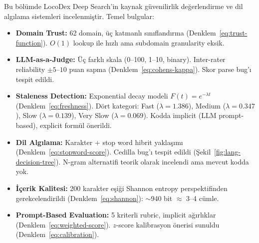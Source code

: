 \begin{ozet}
Bu b\"{o}l\"{u}mde LocoDex Deep Search'in kaynak g\"{u}venilirlik de\u{g}erlendirme ve dil alg{\i}lama sistemleri incelenmi\c{s}tir. Temel bulgular:

\begin{itemize}[leftmargin=1.5em]
  \item \textbf{Domain Trust:} 62 domain, \"{u}\c{c} katmanl{\i} s{\i}n{\i}fland{\i}rma (Denklem~\ref{eq:trust-function}). $O(1)$ lookup ile h{\i}zl{\i} ama subdomain granularity eksik.

  \item \textbf{LLM-as-a-Judge:} \"{U}\c{c} farkl{\i} skala (0--100, 1--10, binary). Inter-rater reliability $\pm 5$--$10$ puan sapma (Denklem~\ref{eq:cohens-kappa}). Skor parse bug'{\i} tespit edildi.

  \item \textbf{Staleness Detection:} Exponential decay modeli $F(t) = e^{-\lambda t}$ (Denklem~\ref{eq:freshness}). D\"{o}rt kategori: Fast ($\lambda=1.386$), Medium ($\lambda=0.347$), Slow ($\lambda=0.139$), Very Slow ($\lambda=0.069$). Kodda implicit (LLM prompt-based), explicit form\"{u}l \"{o}nerildi.

  \item \textbf{Dil Alg{\i}lama:} Karakter $+$ stop word hibrit yakla\c{s}{\i}m{\i} (Denklem~\ref{eq:stopword-score}). Cedilla bug'{\i} tespit edildi (\c{S}ekil~\ref{fig:lang-decision-tree}). N-gram alternatifi teorik olarak incelendi ama mevcut kodda yok.

  \item \textbf{\.{I}\c{c}erik Kalitesi:} 200 karakter e\c{s}i\u{g}i Shannon entropy perspektifinden gerekcelendirildi (Denklem~\ref{eq:shannon}): $\sim$940 bit $\approx$ 3--4 c\"{u}mle.

  \item \textbf{Prompt-Based Evaluation:} 5 kriterli rubric, implicit a\u{g}{\i}rl{\i}klar (Denklem~\ref{eq:weighted-score}). $z$-score kalibrasyon \"{o}nerisi sunuldu (Denklem~\ref{eq:calibration}).
\end{itemize}
\end{ozet}
